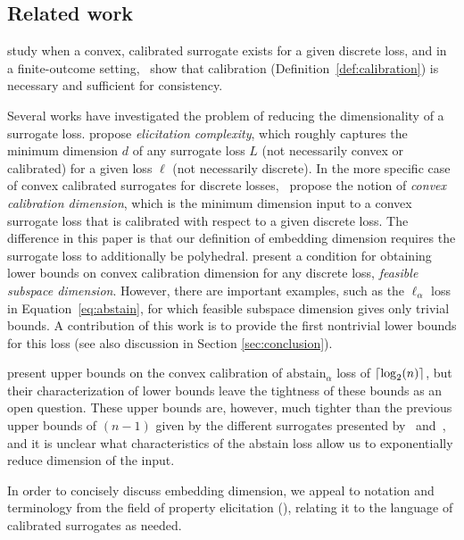 \documentclass[anon]{colt2020} %
\newcommand{\abstain}[1]{\mathrm{abstain}_{#1}}
\newcommand{\ellabs}[1]{\ell_{#1}}
\DeclarePairedDelimiter\ceil{\lceil}{\rceil}
\begin{document}
\subsection{Related work}
\cite{bartlett2006convexity} study when a convex, calibrated surrogate exists for a given discrete loss, and in a finite-outcome setting,~\cite{tewari2007consistency} show that calibration (Definition~\ref{def:calibration}) is necessary and sufficient for consistency.

Several works have investigated the problem of reducing the dimensionality of a surrogate loss.
\cite{frongillo2015elicitation} propose \emph{elicitation complexity}, which roughly captures the minimum dimension $d$ of any surrogate loss $L$ (not necessarily convex or calibrated) for a given loss $\ell$ (not necessarily discrete).
In the more specific case of convex calibrated surrogates for discrete losses,~\cite{ramaswamy2016convex} propose the notion of \emph{convex calibration dimension}, which is the minimum dimension input to a convex surrogate loss that is calibrated with respect to a given discrete loss.
The difference in this paper is that our definition of embedding dimension requires the surrogate loss to additionally be polyhedral.
\cite{ramaswamy2016convex} present a condition for obtaining lower bounds on convex calibration dimension for any discrete loss, \emph{feasible subspace dimension}.
However, there are important examples, such as the $\ellabs{\alpha}$ loss in Equation~\eqref{eq:abstain}, for which feasible subspace dimension gives only trivial bounds.
A contribution of this work is to provide the first nontrivial lower bounds for this loss (see also discussion in Section \ref{sec:conclusion}).

\cite{ramaswamy2018consistent} present upper bounds on the convex calibration of $\abstain{\alpha}$ loss of $\ceil{\log_2(n)}$, but their characterization of lower bounds leave the tightness of these bounds as an open question.
These upper bounds are, however, much tighter than the previous upper bounds of $(n-1)$ given by the different surrogates presented by~\cite{crammer2001algorithmic} and~\cite{rifkin2004defense}, and it is unclear what characteristics of the abstain loss allow us to exponentially reduce dimension of the input.

In order to concisely discuss embedding dimension, we appeal to notation and terminology from the field of property elicitation (\cite{frongillo2015vector-valued, gneiting2007strictly, lambert2009eliciting, osband1985information-eliciting, savage1971elicitation}), relating it to the language of calibrated surrogates as needed.
\end{document}
